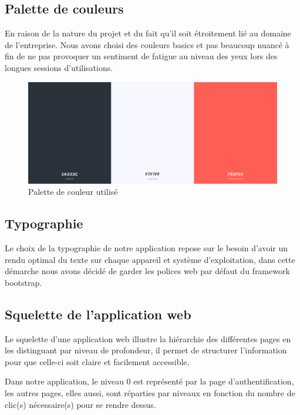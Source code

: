         \subsection{Palette de couleurs}
        En raison de la nature du projet et du fait qu’il soit étroitement lié au domaine de l'entreprise. Nous avons choisi des couleurs basics et pas beaucoup nuancé à fin de ne pas provoquer un sentiment de fatigue au niveau des yeux lors des longues sessions d'utilisations.
        \begin{figure}[h!]
                        \centering
                        \includegraphics[scale=0.3 ]{images/palette_couleurs.PNG}
                        \caption{Palette de couleur utilisé}
                        \label{fig89}
        \end{figure} 
        
        \subsection{Typographie}
            Le choix de la typographie de notre application repose sur le besoin d’avoir un rendu optimal du texte sur chaque appareil et système d'exploitation, dans cette démarche nous avons décidé de garder les polices web par défaut du framework bootstrap.
        
        \subsection{Squelette de l'application web}
        
        Le squelette d’une application web  illustre la hiérarchie des différentes pages en les distinguant par niveau de profondeur, il permet de structurer l’information pour que celle-ci soit claire et facilement accessible.

Dans notre application, le niveau 0 est représenté par la page d’authentification, les autres pages, elles aussi, sont réparties par niveaux en fonction du nombre de clic(s) nécessaire(s) pour se rendre dessus.

